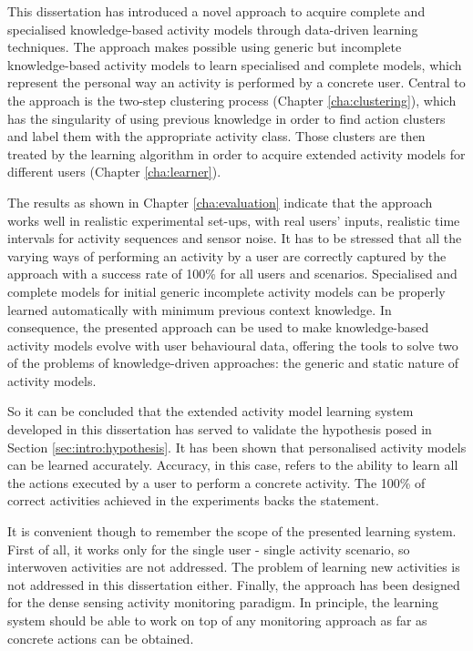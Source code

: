 This dissertation has introduced a novel approach to acquire complete and specialised knowledge-based activity models through data-driven learning techniques. The approach makes possible using generic but incomplete knowledge-based activity models to learn specialised and complete models, which represent the personal way an activity is performed by a concrete user. Central to the approach is the two-step clustering process (Chapter \ref{cha:clustering}), which has the singularity of using previous knowledge in order to find action clusters and label them with the appropriate activity class. Those clusters are then treated by the learning algorithm in order to acquire extended activity models for different users (Chapter \ref{cha:learner}).

The results as shown in Chapter \ref{cha:evaluation} indicate that the approach works well in realistic experimental set-ups, with real users' inputs, realistic time intervals for activity sequences and sensor noise. It has to be stressed that all the varying ways of performing an activity by a user are correctly captured by the approach with a success rate of 100\% for all users and scenarios. Specialised and complete models for initial generic incomplete activity models can be properly learned automatically with minimum previous context knowledge. In consequence, the presented approach can be used to make knowledge-based activity models evolve with user behavioural data, offering the tools to solve two of the problems of knowledge-driven approaches: the generic and static nature of activity models.

So it can be concluded that the extended activity model learning system developed in this dissertation has served to validate the hypothesis posed in Section \ref{sec:intro:hypothesis}. It has been shown that personalised activity models can be learned accurately. Accuracy, in this case, refers to the ability to learn all the actions executed by a user to perform a concrete activity. The 100\% of correct activities achieved in the experiments backs the statement.

It is convenient though to remember the scope of the presented learning system. First of all, it works only for the single user - single activity scenario, so interwoven activities are not addressed. The problem of learning new activities is not addressed in this dissertation either. Finally, the approach has been designed for the dense sensing activity monitoring paradigm. In principle, the learning system should be able to work on top of any monitoring approach as far as concrete actions can be obtained.

